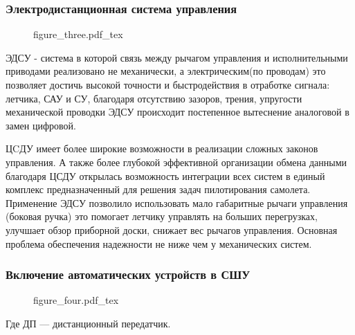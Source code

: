 \documentclass{article}
\begin{document}
\subsubsection{Электродистанционная система управления}
\begin{figure}[ht]
	{figure_three.pdf_tex}
\end{figure}

ЭДСУ - система в которой связь между рычагом управления и исполнительными
приводами реализовано не механически, а электрическим(по проводам) это
позволяет достичь высокой точности и быстродействия в отработке сигнала:
летчика, САУ и СУ, благодаря отсутствию зазоров, трения, упругости механической
проводки ЭДСУ происходит постепенное вытеснение аналоговой в замен цифровой.

ЦCДУ имеет более широкие возможности в реализации сложных законов управления. А
также более глубокой эффективной организации обмена данными благодаря ЦСДУ
открылась возможность интеграции всех систем в единый комплекс предназначенный
для решения задач пилотирования самолета. Применение ЭДСУ позволило
использовать мало габаритные рычаги управления (боковая ручка) это помогает
летчику управлять на больших перегрузках, улучшает обзор приборной доски,
снижает вес рычагов управления. Основная проблема обеспечения надежности не
ниже чем у механических систем.
\newpage

\subsubsection{Включение автоматических устройств в СШУ}
\begin{figure}[ht!]
	{figure_four.pdf_tex}
\end{figure}

Где ДП --- дистанционный передатчик.
\end{document}
